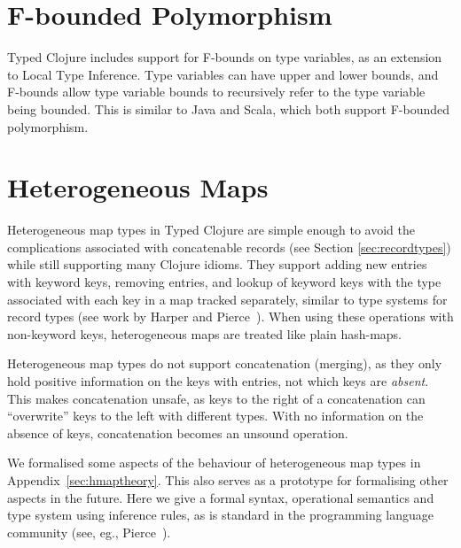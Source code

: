 \section{F-bounded Polymorphism}

Typed Clojure includes support for F-bounds on type variables\cite{CCHOM89}, as an extension
to Local Type Inference. 
Type variables can have upper and lower bounds, and F-bounds allow type variable bounds
to recursively refer to the type variable being bounded.
This is similar to Java and Scala, which both support F-bounded polymorphism.

\section{Heterogeneous Maps}
\label{ref:designhmap}

Heterogeneous map types in Typed Clojure are simple enough to avoid
the complications associated with concatenable records (see Section \ref{sec:recordtypes})
while still supporting many Clojure idioms.
They support adding new entries with keyword keys, removing entries,
and lookup of keyword keys with the type associated with each key in
a map tracked separately, similar to type systems for record types 
(see work by Harper and Pierce~\cite{HP91}).
When using these operations with non-keyword keys, heterogeneous maps
are treated like plain hash-maps.

Heterogeneous map types do not support concatenation (merging), as they
only hold positive information on the keys with entries, not
which keys are \emph{absent}.
This makes concatenation unsafe, as keys to the right of a
concatenation can ``overwrite'' keys to the left with different types. With no information
on the absence of keys, concatenation becomes an unsound operation.

We formalised some aspects of the behaviour of heterogeneous map types in Appendix~\ref{sec:hmaptheory}.
This also serves as a prototype for formalising other aspects in the future.
Here we give a formal syntax, operational semantics and type system using inference
rules, as is standard in the programming language community (see, eg., Pierce~\cite{Pie02}).

